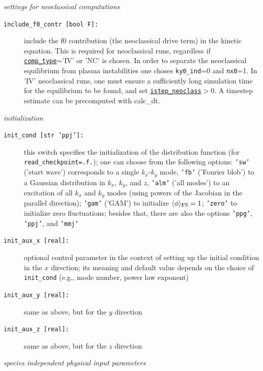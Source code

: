 \documentclass[12pt]{article}
\begin{document}
%
{\em settings for neoclassical computations}
\begin{description}
\item[\hypertarget{include_f0_contr}{\tt include\_f0\_contr [bool F]:}] include the f0 contribution
(the neoclassical drive term) in the kinetic equation. This is required for neoclassical runs, regardless
if \hyperlink{comp_type}{\tt comp\_type}='IV' or 'NC' is chosen. In order to separate the neoclassical equilibrium from plasma instabilities
one choses {\tt ky0\_ind}=0 and {\tt nx0}=1. In 'IV' neoclassical runs, one must ensure a sufficiently long
simulation time for the equilibrium to be found, and set \hyperlink{istep_neoclass}{{\tt istep\_neoclass}$>0$}. A timestep estimate can be precomputed with {calc\_dt}.

\end{description}
%
{\em initialization}
\begin{description}
\item[\hypertarget{init_cond}{\tt init\_cond [str 'ppj']:}] this switch specifies the initialization of the distribution
  function (for \texttt{read\_checkpoint=.f.}); one can choose from the following options:
  \texttt{'sw'} ('start wave') corresponds to a single $k_x$-$k_y$ mode,
  \texttt{'fb'} ('Fourier blob') to a Gaussian distribution in $k_x$, $k_y$, and $z$,
  \texttt{'alm'} ('all modes') to an excitation of all $k_x$ and $k_y$ modes (using powers of the
  Jacobian in the parallel direction);
  \texttt{'gam'} ('GAM') to initialize $\langle\phi\rangle_{\rm FS} = 1$;
  \texttt{'zero'} to initialize zero fluctuations;
  besides that, there are also the options \texttt{'ppg'},
  \texttt{'ppj'}, and \texttt{'mmj'}
\item[\texttt{init\_aux\_x [real]:}] optional control parameter in the context of setting up the initial
  condition in the $x$ direction; its meaning and default value depends on the choice of \texttt{init\_cond}
  (e.g., mode number, power law exponent)
\item[\texttt{init\_aux\_y [real]:}] same as above, but for the $y$ direction
\item[\texttt{init\_aux\_z [real]:}] same as above, but for the $z$ direction
\end{description}
%
{\em species independent physical input parameters}
\end{document}
